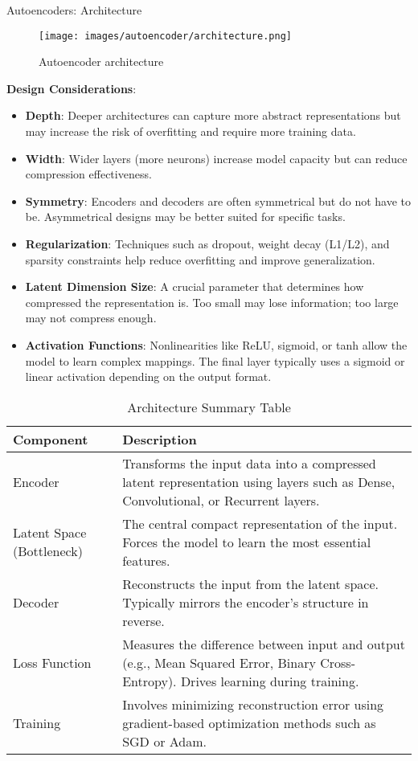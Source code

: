 \begin{frame}[allowframebreaks]{Autoencoders: Architecture}
\begin{figure}
    \centering
    \texttt{[image: images/autoencoder/architecture.png]}
    \caption{Autoencoder architecture}
\end{figure}

\framebreak

\textbf{Design Considerations}:
\small
\begin{itemize}
    \item \textbf{Depth}: Deeper architectures can capture more abstract representations but may increase the risk of overfitting and require more training data.
    \item \textbf{Width}: Wider layers (more neurons) increase model capacity but can reduce compression effectiveness.
    \item \textbf{Symmetry}: Encoders and decoders are often symmetrical but do not have to be. Asymmetrical designs may be better suited for specific tasks.
    \item \textbf{Regularization}: Techniques such as dropout, weight decay (L1/L2), and sparsity constraints help reduce overfitting and improve generalization.
    \item \textbf{Latent Dimension Size}: A crucial parameter that determines how compressed the representation is. Too small may lose information; too large may not compress enough.
    \item \textbf{Activation Functions}: Nonlinearities like ReLU, sigmoid, or tanh allow the model to learn complex mappings. The final layer typically uses a sigmoid or linear activation depending on the output format.
\end{itemize}
\normalsize

\begin{table}[h!]
\centering
\begin{tabular}{|>{\raggedright\arraybackslash}m{2cm}|>{\raggedright\arraybackslash}m{8cm}|}
\hline
\textbf{Component} & \textbf{Description} \\
\hline
Encoder & Transforms the input data into a compressed latent representation using layers such as Dense, Convolutional, or Recurrent layers. \\
\hline
Latent Space (Bottleneck) & The central compact representation of the input. Forces the model to learn the most essential features. \\
\hline
Decoder & Reconstructs the input from the latent space. Typically mirrors the encoder’s structure in reverse. \\
\hline
Loss Function & Measures the difference between input and output (e.g., Mean Squared Error, Binary Cross-Entropy). Drives learning during training. \\
\hline
Training & Involves minimizing reconstruction error using gradient-based optimization methods such as SGD or Adam. \\
\hline
\end{tabular}
\caption{Architecture Summary Table}
\end{table}


\end{frame}
